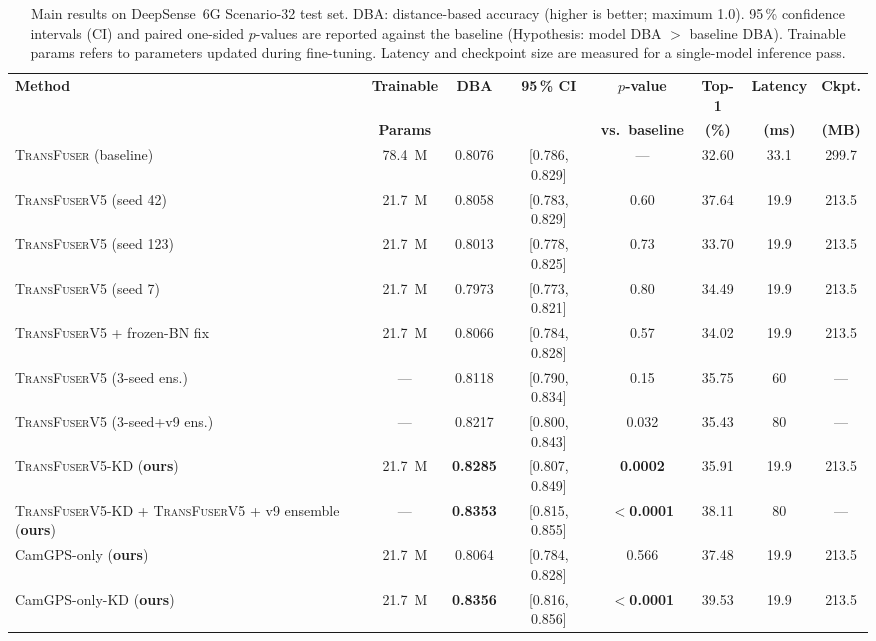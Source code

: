 \documentclass[journal,10pt,twoside]{IEEEtran}
\newcommand{\ours}{\textsc{TransFuserV5}}
\newcommand{\distill}{\textsc{TransFuserV5-KD}}
\newcommand{\baseline}{\textsc{TransFuser}}
\begin{document}
\begin{table}[t]
\centering
\caption{%
  Main results on DeepSense~6G Scenario-32 test set.
  DBA: distance-based accuracy (higher is better; maximum 1.0).
  95\,\% confidence intervals (CI) and paired one-sided $p$-values are reported
  against the baseline (Hypothesis: model DBA $>$ baseline DBA).
  Trainable params refers to parameters updated during fine-tuning.
  Latency and checkpoint size are measured for a single-model inference pass.%
}
\label{tab:main}
\renewcommand{\arraystretch}{1.2}
\begin{tabular}{lccccccc}
\toprule
\textbf{Method} &
\textbf{Trainable} &
\textbf{DBA} &
\textbf{95\,\% CI} &
\textbf{$p$-value} &
\textbf{Top-1} &
\textbf{Latency} &
\textbf{Ckpt.} \\
& \textbf{Params} & & & \textbf{vs.\ baseline} & \textbf{(\%)} &
\textbf{(ms)} & \textbf{(MB)} \\
\midrule
\baseline{} (baseline) & 78.4~M & 0.8076 & [0.786, 0.829] & ---           & 32.60 & 33.1 & 299.7 \\
\ours{} (seed 42)       & 21.7~M & 0.8058 & [0.783, 0.829] & 0.60          & 37.64 & 19.9 & 213.5 \\
\ours{} (seed 123)      & 21.7~M & 0.8013 & [0.778, 0.825] & 0.73          & 33.70 & 19.9 & 213.5 \\
\ours{} (seed 7)        & 21.7~M & 0.7973 & [0.773, 0.821] & 0.80          & 34.49 & 19.9 & 213.5 \\
\ours{} + frozen-BN fix & 21.7~M & 0.8066 & [0.784, 0.828] & 0.57          & 34.02 & 19.9 & 213.5 \\
\ours{} (3-seed ens.)   & ---    & 0.8118 & [0.790, 0.834] & 0.15          & 35.75 & 60   & ---   \\
\ours{} (3-seed+v9 ens.)& ---    & 0.8217 & [0.800, 0.843] & 0.032         & 35.43 & 80   & ---   \\
\midrule
\distill{} (\textbf{ours}) & 21.7~M & \textbf{0.8285} & [0.807, 0.849] & \textbf{0.0002} & 35.91 & 19.9 & 213.5 \\
\distill{} + \ours{} + v9 ensemble (\textbf{ours}) & --- & \textbf{0.8353} & [0.815, 0.855] & \textbf{$<$0.0001} & 38.11 & 80 & --- \\
\midrule
CamGPS-only (\textbf{ours}) & 21.7~M & 0.8064 & [0.784, 0.828] & 0.566 & 37.48 & 19.9 & 213.5 \\
CamGPS-only-KD (\textbf{ours}) & 21.7~M & \textbf{0.8356} & [0.816, 0.856] & \textbf{$<$0.0001} & 39.53 & 19.9 & 213.5 \\
\bottomrule
\end{tabular}
\end{table}
\end{document}
